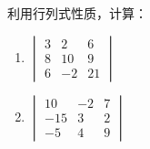 \begin{example}
  利用行列式性质，计算：
\begin{multicols}{2}
\begin{enumerate}[(1)]
  \item $\begin{vmatrix}3&2&6\\8&10&9\\6&-2&21\end{vmatrix}$
  \item $\begin{vmatrix} 10& - 2& 7\\ - 15& 3& 2\\ - 5& 4& 9\end{vmatrix} $
\end{enumerate}
\end{multicols}
\end{example}

